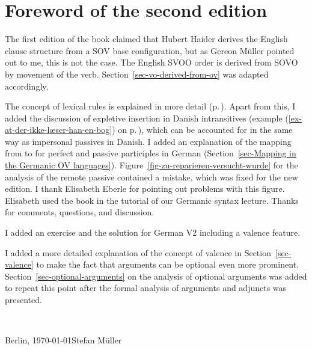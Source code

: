 \section*{Foreword of the second edition}



The first edition of the book claimed that Hubert Haider derives the English clause structure from a
SOV base configuration, but as Gereon Müller pointed out to me, this is not the case. The English
SVOO order is derived from SOVO by movement of the verb. Section~\ref{sec-vo-derived-from-ov} was
adapted accordingly.

The concept of lexical rules is explained in more detail
(p.\,\pageref{page-lexical-rule-explanation-start}). %
Apart from this, I added the discussion of expletive insertion in Danish intransitives (example (\ref{ex-at-der-ikke-læser-han-en-bog}) on
p.\,\pageref{ex-at-der-ikke-læser-han-en-bog}), which can be accounted for in the same way as
impersonal passives in Danish. I added an explanation of the mapping from \argst to \comps for
perfect and passive participles in German (Section~\ref{sec-Mapping in the Germanic OV
  languages}). Figure~\ref{fig-zu-reparieren-versucht-wurde} for the analysis of the remote passive contained a mistake, which was
fixed for the new edition. I thank Elisabeth Eberle for pointing out problems with this figure. Elisabeth used the book in the tutorial of our
Germanic syntax lecture. Thanks for comments, questions, and discussion.


I added an exercise and the solution for German V2 including a valence feature.




I added a more detailed explanation of the concept of valence in Section~\ref{sec-valence} to make the fact that arguments can be
optional even more prominent. Section~\ref{sec-optional-arguments} on the analysis of optional arguments was added to repeat
this point after the formal analysis of arguments and adjuncts was presented.





~\medskip

\noindent
Berlin, \today\hfill Stefan Müller

